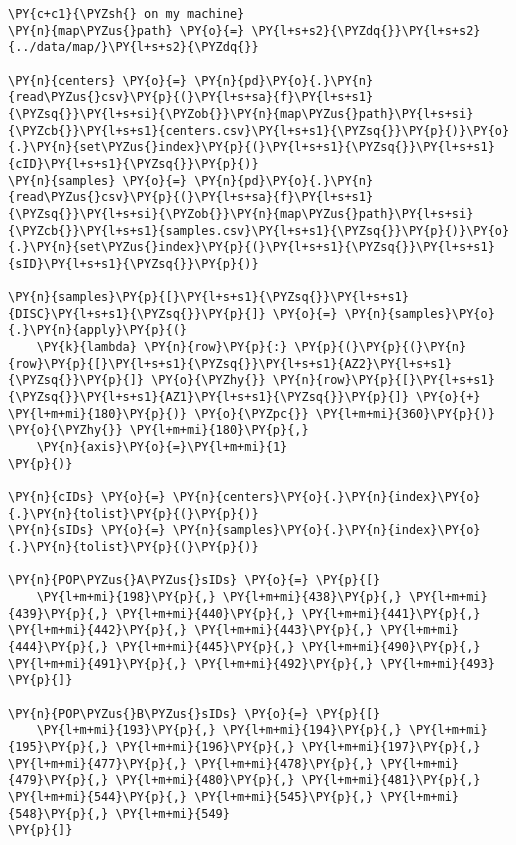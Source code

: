     \begin{tcolorbox}[breakable, size=fbox, boxrule=1pt, pad at break*=1mm,colback=cellbackground, colframe=cellborder]
\begin{Verbatim}[commandchars=\\\{\}]
\PY{c+c1}{\PYZsh{} on my machine}
\PY{n}{map\PYZus{}path} \PY{o}{=} \PY{l+s+s2}{\PYZdq{}}\PY{l+s+s2}{../data/map/}\PY{l+s+s2}{\PYZdq{}}

\PY{n}{centers} \PY{o}{=} \PY{n}{pd}\PY{o}{.}\PY{n}{read\PYZus{}csv}\PY{p}{(}\PY{l+s+sa}{f}\PY{l+s+s1}{\PYZsq{}}\PY{l+s+si}{\PYZob{}}\PY{n}{map\PYZus{}path}\PY{l+s+si}{\PYZcb{}}\PY{l+s+s1}{centers.csv}\PY{l+s+s1}{\PYZsq{}}\PY{p}{)}\PY{o}{.}\PY{n}{set\PYZus{}index}\PY{p}{(}\PY{l+s+s1}{\PYZsq{}}\PY{l+s+s1}{cID}\PY{l+s+s1}{\PYZsq{}}\PY{p}{)}
\PY{n}{samples} \PY{o}{=} \PY{n}{pd}\PY{o}{.}\PY{n}{read\PYZus{}csv}\PY{p}{(}\PY{l+s+sa}{f}\PY{l+s+s1}{\PYZsq{}}\PY{l+s+si}{\PYZob{}}\PY{n}{map\PYZus{}path}\PY{l+s+si}{\PYZcb{}}\PY{l+s+s1}{samples.csv}\PY{l+s+s1}{\PYZsq{}}\PY{p}{)}\PY{o}{.}\PY{n}{set\PYZus{}index}\PY{p}{(}\PY{l+s+s1}{\PYZsq{}}\PY{l+s+s1}{sID}\PY{l+s+s1}{\PYZsq{}}\PY{p}{)}

\PY{n}{samples}\PY{p}{[}\PY{l+s+s1}{\PYZsq{}}\PY{l+s+s1}{DISC}\PY{l+s+s1}{\PYZsq{}}\PY{p}{]} \PY{o}{=} \PY{n}{samples}\PY{o}{.}\PY{n}{apply}\PY{p}{(}
    \PY{k}{lambda} \PY{n}{row}\PY{p}{:} \PY{p}{(}\PY{p}{(}\PY{n}{row}\PY{p}{[}\PY{l+s+s1}{\PYZsq{}}\PY{l+s+s1}{AZ2}\PY{l+s+s1}{\PYZsq{}}\PY{p}{]} \PY{o}{\PYZhy{}} \PY{n}{row}\PY{p}{[}\PY{l+s+s1}{\PYZsq{}}\PY{l+s+s1}{AZ1}\PY{l+s+s1}{\PYZsq{}}\PY{p}{]} \PY{o}{+} \PY{l+m+mi}{180}\PY{p}{)} \PY{o}{\PYZpc{}} \PY{l+m+mi}{360}\PY{p}{)} \PY{o}{\PYZhy{}} \PY{l+m+mi}{180}\PY{p}{,}
    \PY{n}{axis}\PY{o}{=}\PY{l+m+mi}{1}
\PY{p}{)}

\PY{n}{cIDs} \PY{o}{=} \PY{n}{centers}\PY{o}{.}\PY{n}{index}\PY{o}{.}\PY{n}{tolist}\PY{p}{(}\PY{p}{)}
\PY{n}{sIDs} \PY{o}{=} \PY{n}{samples}\PY{o}{.}\PY{n}{index}\PY{o}{.}\PY{n}{tolist}\PY{p}{(}\PY{p}{)}

\PY{n}{POP\PYZus{}A\PYZus{}sIDs} \PY{o}{=} \PY{p}{[}
    \PY{l+m+mi}{198}\PY{p}{,} \PY{l+m+mi}{438}\PY{p}{,} \PY{l+m+mi}{439}\PY{p}{,} \PY{l+m+mi}{440}\PY{p}{,} \PY{l+m+mi}{441}\PY{p}{,} \PY{l+m+mi}{442}\PY{p}{,} \PY{l+m+mi}{443}\PY{p}{,} \PY{l+m+mi}{444}\PY{p}{,} \PY{l+m+mi}{445}\PY{p}{,} \PY{l+m+mi}{490}\PY{p}{,} \PY{l+m+mi}{491}\PY{p}{,} \PY{l+m+mi}{492}\PY{p}{,} \PY{l+m+mi}{493}
\PY{p}{]}

\PY{n}{POP\PYZus{}B\PYZus{}sIDs} \PY{o}{=} \PY{p}{[}
    \PY{l+m+mi}{193}\PY{p}{,} \PY{l+m+mi}{194}\PY{p}{,} \PY{l+m+mi}{195}\PY{p}{,} \PY{l+m+mi}{196}\PY{p}{,} \PY{l+m+mi}{197}\PY{p}{,} \PY{l+m+mi}{477}\PY{p}{,} \PY{l+m+mi}{478}\PY{p}{,} \PY{l+m+mi}{479}\PY{p}{,} \PY{l+m+mi}{480}\PY{p}{,} \PY{l+m+mi}{481}\PY{p}{,} \PY{l+m+mi}{544}\PY{p}{,} \PY{l+m+mi}{545}\PY{p}{,} \PY{l+m+mi}{548}\PY{p}{,} \PY{l+m+mi}{549}
\PY{p}{]}


\end{Verbatim}
\end{tcolorbox}
